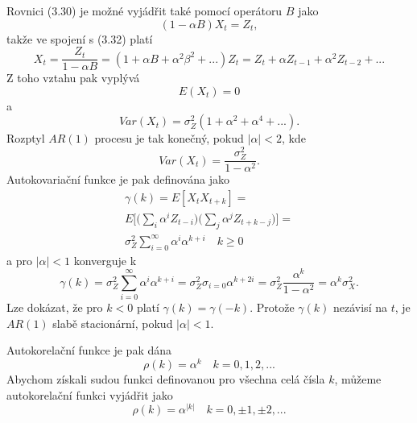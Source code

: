 Rovnici (3.30) je možné vyjádřit také pomocí operátoru $B$ jako
\begin{equation}
(1 - \alpha B)X_t = Z_t,
\end{equation}
takže ve spojení s (3.32) platí
\begin{equation}
X_t = \frac{Z_t}{1 - \alpha B} = (1 + \alpha B + \alpha^2 \beta^2 + ...) Z_t = Z_t + \alpha Z_{t - 1} + \alpha^2 Z_{t - 2} + ...
\end{equation}
Z toho vztahu pak vyplývá
\begin{equation}
E(X_t) = 0
\end{equation}
a
\begin{equation}
Var(X_t) = \sigma_Z^2 (1 + \alpha^2 + \alpha^4 + ...).
\end{equation}
Rozptyl $AR(1)$ procesu je tak konečný, pokud $|\alpha| < 2$, kde
\begin{equation}
Var(X_t) = \frac{\sigma_Z^2}{1 - \alpha^2}.
\end{equation}
Autokovariační funkce je pak definována jako
\begin{multline}
\gamma(k) = E[X_t X_{t + k}] =\\
E\Big[\Big(\sum_i \alpha^i Z_{t-i}\Big)\Big(\sum_j \alpha^j Z_{t+k-j}\Big)\Big] =\\
\sigma_Z^2 \sum_{i=0}^{\infty} \alpha^i \alpha^{k + i} \quad k \ge 0
\end{multline}
a pro $|\alpha| < 1$ konverguje k
\begin{equation}
\gamma(k) = \sigma_Z^2 \sum_{i=0}^{\infty} \alpha^i \alpha^{k + i} = \sigma_Z^2 \sigma_{i = 0} \alpha^{k + 2i} = \sigma_Z^2 \frac{\alpha^k}{1 - \alpha^2} = \alpha^k \sigma_X^2.
\end{equation}
Lze dokázat, že pro $k < 0$ platí $\gamma(k) = \gamma(-k)$. Protože $\gamma(k)$ nezávisí na $t$, je $AR(1)$ slabě stacionární, pokud $|\alpha| < 1$.

Autokorelační funkce je pak dána
\begin{equation}
\rho(k) = \alpha^k \quad k = 0, 1, 2, ...
\end{equation}
Abychom získali sudou funkci definovanou pro všechna celá čísla $k$, můžeme autokorelační funkci vyjádřit jako
\begin{equation}
\rho(k) = \alpha^{|k|} \quad k = 0, \pm 1, \pm 2, ...
\end{equation}

